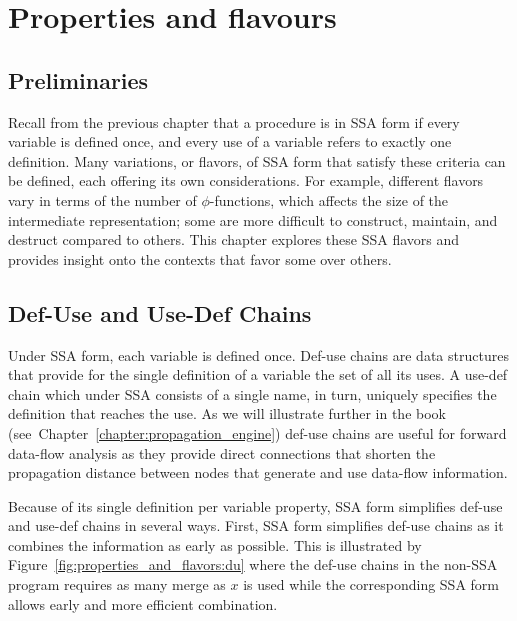 \chapter{Properties and flavours }
\label{chap:properties_and_flavours}
\graphicspath{{Figs/}{properties_and_flavours/Figs/}{part1/properties_and_flavours/Figs/}{./}{properties_and_flavours/}{part1/properties_and_flavours/}}


\section{Preliminaries}

Recall from the previous chapter that a procedure is in SSA form if
every variable is defined once, and every use of a variable refers
to exactly one definition. Many variations, or flavors, of SSA form that 
satisfy these criteria can be defined, each offering its own considerations.
For example, different flavors vary in terms of the number of $\phi$-functions,
which affects the size of the intermediate representation; some are more difficult to construct, maintain, and destruct
compared to others. This chapter explores these SSA flavors and provides
insight onto the contexts that favor some over others. 

\section{Def-Use and Use-Def Chains}
Under SSA form, each variable is defined once. Def-use chains are data structures that provide for the single definition of a variable the set of all its uses. A use-def chain which under SSA consists of a single name, in turn, uniquely specifies the definition that reaches the use. As we will illustrate further in the book (see~Chapter~\ref{chapter:propagation_engine}) def-use chains are useful for forward data-flow analysis as they provide direct connections that shorten the propagation distance between nodes that generate and use data-flow information. 

Because of its single definition per variable property, SSA form simplifies def-use and use-def chains in several ways. First, SSA form simplifies def-use chains as it combines the information as early as possible.
This is illustrated by Figure~\ref{fig:properties_and_flavors:du} where the def-use chains in the non-SSA program requires as many merge as $x$ is used while the corresponding SSA form allows early and more efficient combination. 

